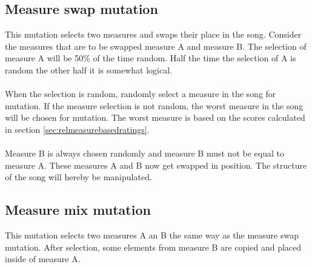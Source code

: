 \subsection{Measure swap mutation}
This mutation selects two measures and swaps their place in the song. Consider the measures that are to be swapped measure A and measure B. The selection of measure A will be 50\% of the time random. Half the time the selection of A is random the other half it is somewhat logical.
\\\\
When the selection is random, randomly select a measure in the song for mutation. If the measure selection is not random, the worst measure in the song will be chosen for mutation. The worst measure is based on the scores calculated in section \ref{sec:relmeasurebasedratings}.
\\\\
Measure B is always chosen randomly and measure B must not be equal to measure A. These measures A and B now get swapped in position. The structure of the song will hereby be manipulated.

\subsection{Measure mix mutation}
This mutation selects two measures A an B the same way as the measure swap mutation. After selection, some elements from measure B are copied and placed inside of measure A.
